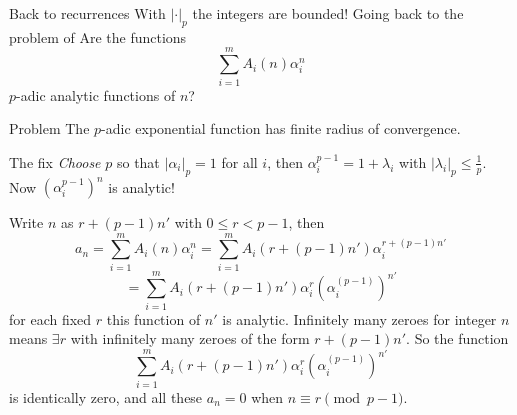 \documentclass[notheorems]{beamer}
\theoremstyle{plain}
\newcommand{\lt}{<}
\begin{document}
\begin{frame}{Back to recurrences}
    With \(|\cdot|_p\) the integers are bounded!
    \pause
    Going back to the problem of 
    Are the functions%
    \begin{equation*}
        \sum_{i=1}^m A_i(n)\alpha_i^n
    \end{equation*}
    \(p\)-adic analytic functions of \(n\)?%
    \par
    \pause
    \begin{alertblock}{Problem}
        The \(p\)-adic exponential function has finite radius of convergence.
    \end{alertblock}
    \pause
    \begin{exampleblock}{The fix}
        \emph{Choose} \(p\) so that \(|\alpha_i|_p = 1\) for all \(i\), then \(\alpha_i^{p-1} = 1 + \lambda_i\) with \(|\lambda_i|_p \le \frac 1p\).
        Now \((\alpha_i^{p-1})^n\) is analytic!%
    \end{exampleblock}
\end{frame}

\begin{frame}
    Write \(n\) as \(r + (p-1)n'\) with \(0\le r \lt p-1\)\pause, then
    \begin{equation*}
        a_n = \sum_{i=1}^m A_i(n)\alpha_i^n = \sum_{i=1}^m A_i(r + (p-1)n')\alpha_i^{r + (p-1)n'}
    \end{equation*}
    \begin{equation*}
        = \sum_{i=1}^m A_i(r + (p-1)n')\alpha_i^{r} (\alpha_i^{(p-1)})^{n'}
    \end{equation*}
    for each fixed \(r\) this function of \(n'\) is analytic.
    \pause Infinitely many zeroes for integer \(n\) means \(\exists r\) with infinitely many zeroes of the form \(r + (p-1)n'\). So the function%
    \begin{equation*}
        \sum_{i=1}^m A_i(r + (p-1)n')\alpha_i^{r} (\alpha_i^{(p-1)})^{n'}
    \end{equation*}
    is identically zero, and all these \(a_n = 0\) when \(n \equiv r \pmod{p-1}\).%
    \par
\end{frame}
\end{document}

